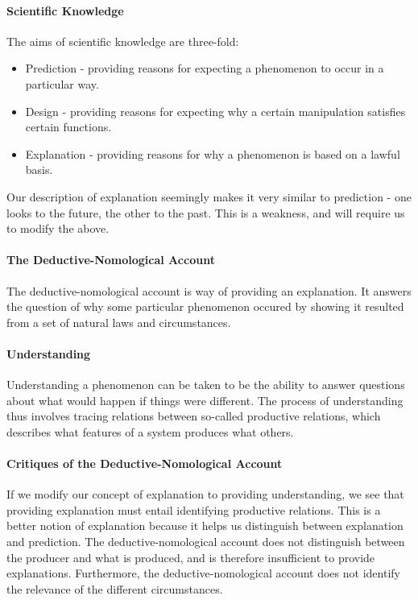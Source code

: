\paragraph{Scientific Knowledge}
The aims of scientific knowledge are three-fold:
\begin{itemize}
	\item Prediction - providing reasons for expecting a phenomenon to occur in a particular way.
	\item Design - providing reasons for expecting why a certain manipulation satisfies certain functions.
	\item Explanation - providing reasons for why a phenomenon is based on a lawful basis.
\end{itemize}
Our description of explanation seemingly makes it very similar to prediction - one looks to the future, the other to the past. This is a weakness, and will require us to modify the above.

\paragraph{The Deductive-Nomological Account}
The deductive-nomological account is way of providing an explanation. It answers the question of why some particular phenomenon occured by showing it resulted from a set of natural laws and circumstances.

\paragraph{Understanding}
Understanding a phenomenon can be taken to be the ability to answer questions about what would happen if things were different. The process of understanding thus involves tracing relations between so-called productive relations, which describes what features of a system produces what others.

\paragraph{Critiques of the Deductive-Nomological Account}
If we modify our concept of explanation to providing understanding, we see that providing explanation must entail identifying productive relations. This is a better notion of explanation because it helps us distinguish between explanation and prediction. The deductive-nomological account does not distinguish between the producer and what is produced, and is therefore insufficient to provide explanations. Furthermore, the deductive-nomological account does not identify the relevance of the different circumstances.

